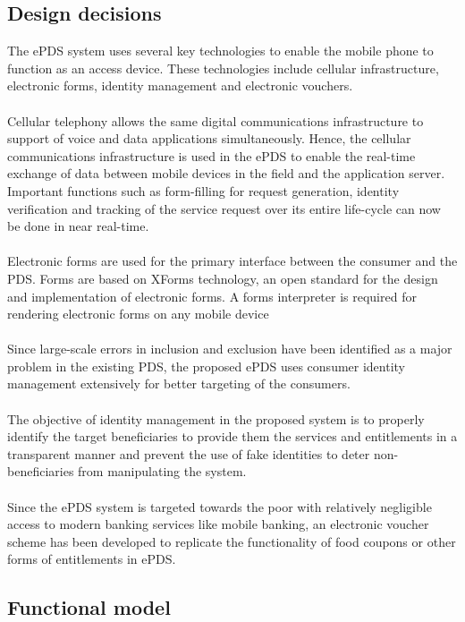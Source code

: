 \documentclass{article}
\begin{document}
\subsection{Design decisions}
 The ePDS system uses several key technologies to enable the mobile phone to function as an access device. These technologies include cellular infrastructure, electronic forms, identity management and electronic vouchers.
\\ \\
Cellular telephony allows the same digital communications infrastructure to support of voice and data applications simultaneously. Hence, the cellular communications infrastructure is used in the ePDS to enable the real-time exchange of data between mobile devices in the field and the application server. Important functions such as form-filling for request generation, identity verification and tracking of the service request over its entire life-cycle can now be done in near real-time.
\\ \\
Electronic forms are used for the primary interface between the consumer and the PDS. Forms are based on XForms technology, an open standard for the design and implementation of electronic forms. A forms interpreter is required for rendering electronic forms on any mobile device
\\ \\
Since large-scale errors in inclusion and exclusion have been identified as a major problem in the existing PDS, the proposed ePDS uses consumer identity management extensively for better targeting of the consumers.
\\ \\
The objective of identity management in the proposed system is to properly identify the target beneficiaries to provide them the services and entitlements in a transparent manner and prevent the use of fake identities to deter non-beneficiaries from manipulating the system.
\\ \\
Since the ePDS system is targeted towards the poor with relatively negligible access to modern banking services like mobile banking, an electronic voucher scheme has been developed to replicate the functionality of food coupons or other forms of entitlements in ePDS.


\subsection{Functional model}
\end{document}
